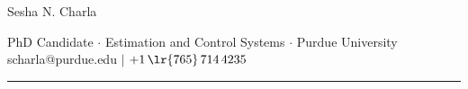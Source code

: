 \documentclass[letterpaper, 10pt]{article}
\begin{document}
\begin{center}
        \huge
        Sesha N. Charla
\end{center}
\begin{center}
        PhD Candidate $\cdot$
        Estimation and Control Systems $\cdot$
        Purdue University \\
        scharla@purdue.edu $|$
        $+1\,\lr{765}\, 714 \, 4235$
\end{center}

\noindent\rule{\textwidth}{0.4pt}






\end{document}
